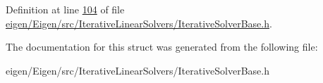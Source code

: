 Definition at line \hyperlink{eigen_2_eigen_2src_2_iterative_linear_solvers_2_iterative_solver_base_8h_source_l00104}{104} of file \hyperlink{eigen_2_eigen_2src_2_iterative_linear_solvers_2_iterative_solver_base_8h_source}{eigen/\+Eigen/src/\+Iterative\+Linear\+Solvers/\+Iterative\+Solver\+Base.\+h}.



The documentation for this struct was generated from the following file\+:\begin{DoxyCompactItemize}
\item 
eigen/\+Eigen/src/\+Iterative\+Linear\+Solvers/\+Iterative\+Solver\+Base.\+h\end{DoxyCompactItemize}
